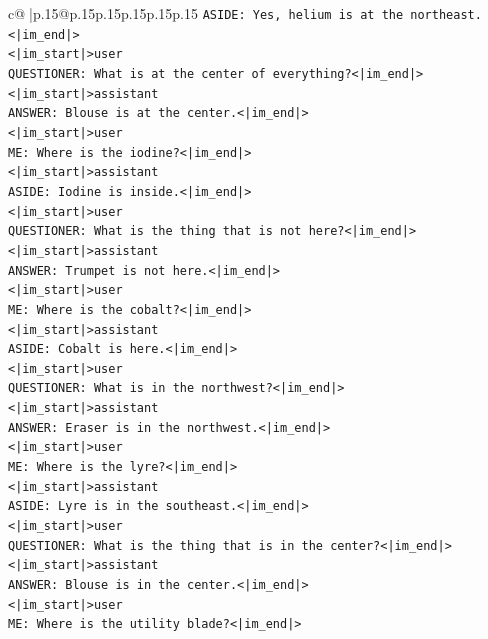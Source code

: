 \documentclass{article}
\begin{document}
{\begin{supertabular}{c@{$\;$}|p{.15\linewidth}@{}p{.15\linewidth}p{.15\linewidth}p{.15\linewidth}p{.15\linewidth}p{.15\linewidth}}
{{{\texttt{ASIDE: Yes, helium is at the northeast.<|im\_end|>} \\
\texttt{<|im\_start|>user} \\
\texttt{QUESTIONER: What is at the center of everything?<|im\_end|>} \\
\texttt{<|im\_start|>assistant} \\
\texttt{ANSWER: Blouse is at the center.<|im\_end|>} \\
\texttt{<|im\_start|>user} \\
\texttt{ME: Where is the iodine?<|im\_end|>} \\
\texttt{<|im\_start|>assistant} \\
\texttt{ASIDE: Iodine is inside.<|im\_end|>} \\
\texttt{<|im\_start|>user} \\
\texttt{QUESTIONER: What is the thing that is not here?<|im\_end|>} \\
\texttt{<|im\_start|>assistant} \\
\texttt{ANSWER: Trumpet is not here.<|im\_end|>} \\
\texttt{<|im\_start|>user} \\
\texttt{ME: Where is the cobalt?<|im\_end|>} \\
\texttt{<|im\_start|>assistant} \\
\texttt{ASIDE: Cobalt is here.<|im\_end|>} \\
\texttt{<|im\_start|>user} \\
\texttt{QUESTIONER: What is in the northwest?<|im\_end|>} \\
\texttt{<|im\_start|>assistant} \\
\texttt{ANSWER: Eraser is in the northwest.<|im\_end|>} \\
\texttt{<|im\_start|>user} \\
\texttt{ME: Where is the lyre?<|im\_end|>} \\
\texttt{<|im\_start|>assistant} \\
\texttt{ASIDE: Lyre is in the southeast.<|im\_end|>} \\
\texttt{<|im\_start|>user} \\
\texttt{QUESTIONER: What is the thing that is in the center?<|im\_end|>} \\
\texttt{<|im\_start|>assistant} \\
\texttt{ANSWER: Blouse is in the center.<|im\_end|>} \\
\texttt{<|im\_start|>user} \\
\texttt{ME: Where is the utility blade?<|im\_end|>} \\
}}}
\end{supertabular}}
\end{document}
